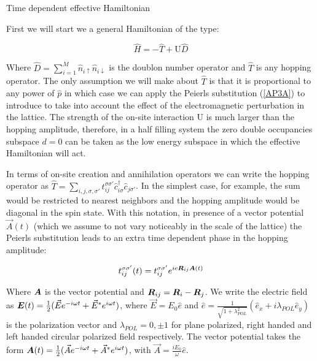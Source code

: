 \begin{section}{Time dependent effective Hamiltonian}
\label{SectionTDHeff}

First we will start we a general Hamiltonian of the type:

\begin{equation}
\hat{H} = -\hat{T} + \text{U}\hat{D}
\end{equation}

Where $\hat{D} = \sum_{i=1}^M \hat{n}_{i\uparrow}\hat{n}_{i\downarrow}$ is the doublon number operator and $\hat{T}$ is any hopping operator. The only assumption we will make about $\hat{T}$ is that it is proportional to any power of $\hat{p}$ in which case we can apply the Peierls substitution (\ref{AP3A}) to introduce to take into account the effect of the electromagnetic perturbation in the lattice. The strength of the on-site interaction $\text{U}$ is much larger than the hopping amplitude, therefore, in a half filling system the zero double occupancies subspace $d=0$ can be taken as the low energy subspace in which the effective Hamiltonian will act.

In terms of on-site creation and annihilation operators we can write the hopping operator as $\hat{T} = \sum_{i,j, \sigma, \sigma'} t_{ij}^{\sigma \sigma'} \hat{c}_{i \sigma}^\dagger \hat{c}_{j \sigma'}$. In the simplest case, for example, the sum would be restricted to nearest neighbors and the hopping amplitude would be diagonal in the spin state. With this notation, in presence of a vector potential $\vec{A}(t)$ (which we assume to not vary noticeably in the scale of the lattice) the Peierls substitution leads to an extra time dependent phase in the hopping amplitude:

\begin{equation}
t_{ij}^{\sigma \sigma'}(t) = t_{ij}^{\sigma \sigma'} e^{ie\boldsymbol{R}_{ij}\boldsymbol{A}(t)}
\end{equation}

Where $\boldsymbol{A}$ is the vector potential and $\boldsymbol{R}_{ij} = \boldsymbol{R}_i-\boldsymbol{R}_j$. We write the electric field as $\boldsymbol{E}(t) = \frac{1}{2}(\vec{E}e^{-i\omega t}+\vec{E}^*e^{i\omega t})$, where $\vec{E} = E_0\hat{e}$ and $\hat{e} = \frac{1}{\sqrt{1+\lambda_{POL}^2}}(\hat{e}_x+i\lambda_{POL}\hat{e}_y)$ is the polarization vector and $\lambda_{POL} = 0, \pm 1$ for plane polarized, right handed and left handed circular polarized field respectively. The vector potential takes the form $\boldsymbol{A}(t) = \frac{1}{2}(\vec{A}e^{-i\omega t} + \vec{A}^* e^{i\omega t})$, with $\vec{A} = \frac{iE_0}{\omega}\hat{e}$.


\end{section}
